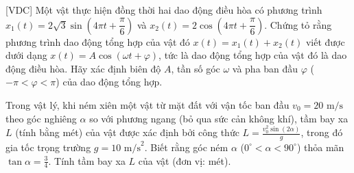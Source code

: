 \begin{bt}%
[VDC]%
	Một vật thực hiện đồng thời hai dao động điều hòa có phương trình $x_1(t) =2\sqrt{3} \sin \left(4\pi t+\dfrac{\pi}{6}\right)$ và $x_2(t) = 2\cos \left(4\pi t+\dfrac{\pi}{6}\right)$. Chứng tỏ rằng phương trình dao động tổng hợp của vật đó $x(t) = x_1(t)+x_2(t)$ viết được dưới dạng $x(t) = A\cos (\omega t + \varphi)$, tức là dao động tổng hợp của vật đó là dao động điều hòa. Hãy xác định biên độ $A$, tần số góc $\omega$ và pha ban đầu $\varphi$ ($-\pi<\varphi<\pi$) của dao động tổng hợp.
\end{bt}

\begin{bt}%
	Trong vật lý, khi ném xiên một vật từ mặt đất với vận tốc ban đầu $v_0 = 20\text{ m/s}$ theo góc nghiêng $\alpha$ so với phương ngang (bỏ qua sức cản không khí), tầm bay xa $L$ (tính bằng mét) của vật được xác định bởi công thức $L = \frac{v_0^2 \sin(2\alpha)}{g}$, trong đó gia tốc trọng trường $g = 10\text{ m/s}^2$. Biết rằng góc ném $\alpha$ ($0^\circ < \alpha < 90^\circ$) thỏa mãn $\tan \alpha = \frac{3}{4}$. Tính tầm bay xa $L$ của vật (đơn vị: mét).
\end{bt}
